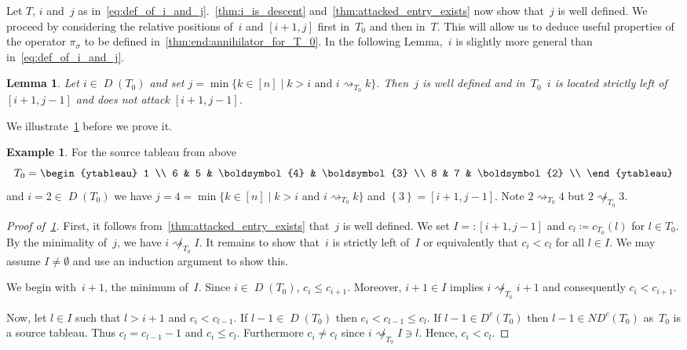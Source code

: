 \documentclass[10pt]{amsart}
\theoremstyle{plain}
\theoremstyle{plain}
\newtheorem{lemma}[lemma]{Lemma}
\theoremstyle{plain}
\theoremstyle{plain}
\theoremstyle{plain}
\theoremstyle{definition}
\theoremstyle{definition}
\newtheorem{exam}[exam]{Example}
\newcommand{\bs}[1]{\boldsymbol{#1} }
\newcommand{\D}{\operatorname{\mathit{D}}}
\newcommand{\DC}{\operatorname{\mathit{D^c}}}
\newcommand{\ND}{\operatorname{\mathit{ND^c}}}
\newcommand{\set}[1]{\left\{ #1 \right\}}
\newcommand{\att}{\rightsquigarrow}
\begin{document}
Let $T$, $i$ and~$j$ as in~\eqref{eq:def_of_i_and_j}.~\cref{thm:i_is_descent} and~\cref{thm:attacked_entry_exists} now show that~$j$ is well defined. We proceed by considering the relative positions of~$i$ and $[i+1,j]$ first in~$T_0$ and then in~$T$. This will allow us to deduce useful properties of the operator $\pi_\sigma$ to be defined in~\cref{thm:end:annihilator_for_T_0}. In the following Lemma,~$i$ is slightly more general than in~\eqref{eq:def_of_i_and_j}.

\begin{lemma}
	\label{thm:position_of_entries_smaller_as_attacked_entry_in_T_0}
	Let $i\in \D(T_0)$ and set $j = \min \{k \in [n] \mid k>i \text{ and } i\att_{T_0} k \}$.
	Then~$j$ is well defined and in~$T_0$~$i$ is located strictly left of $[i+1,j-1]$ and does not attack $[i+1,j-1]$.
\end{lemma}

We illustrate~\cref{thm:position_of_entries_smaller_as_attacked_entry_in_T_0} before we prove it.

	\begin{exam} For the source tableau from above
		\[
			T_0
			= 
\begin{ytableau} 
1 \\ 
6 & 5 & \bs4 & \bs3 \\ 
8 & 7 & \bs2 \\ 
\end{ytableau} 
		\]
		and $i=2\in \D(T_0)$ we have $j = 4 =\min \{k \in [n] \mid k>i \text{ and } i\att_{T_0} k \}$ and $\set{3} = [i+1,j-1]$. Note $2\att_{T_0} 4$ but $2\not \att_{T_0} 3$.
	\end{exam}

	\begin{proof}[Proof of~\cref{thm:position_of_entries_smaller_as_attacked_entry_in_T_0}]
		First, it follows from~\cref{thm:attacked_entry_exists} that~$j$ is well defined. 
		We set $I =: [i+1,j-1]$ and $c_l \coloneqq c_{T_0}(l)$ for $l \in T_0$.
		By the minimality of~$j$, we have $i\not \att_{T_0} I$.
		It remains to show that~$i$ is strictly left of~$I$ or equivalently that $c_i < c_l$ for all $l\in I$.
		We may assume $I\neq \emptyset$ and use an induction argument to show this.
		
		We begin with~$i+1$, the minimum of~$I$.
		 Since $i\in \D(T_0)$, $c_i \leq c_{i+1}$. Moreover, $i+1\in I$ implies $i\not \att_{T_0} i+1$ and consequently $c_i < c_{i+1}$.
		
		Now, let $l\in I$ such that $l>i+1$ and $c_i < c_{l-1}$.
		If $l-1\in \D(T_0)$ then $c_i < c_{l-1} \leq c_l$.
		If $l-1\in \DC(T_0)$ then $l-1\in \ND(T_0)$ as~$T_0$ is a source tableau.
		Thus $c_l= c_{l-1}-1$ and $c_i \leq c_l$. Furthermore $c_i \neq c_l$ since $i\not \att_{T_0} I \ni l$.
		Hence, $c_i< c_l$.
			 \qedhere
	\end{proof}
\end{document}
